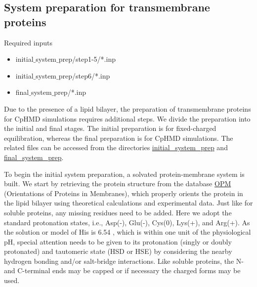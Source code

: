 \subsection{System preparation for transmembrane proteins}

\begin{checklist}{Required inputs}
\begin{itemize}
\item initial$\_$system$\_$prep/step1-5/*.inp
\item initial$\_$system$\_$prep/step6/*.inp
\item final$\_$system$\_$prep/*.inp
\end{itemize}
\end{checklist}
Due to the presence of a lipid bilayer, the preparation of transmembrane proteins for CpHMD simulations requires additional steps.
We divide the preparation into the initial and final stages.
The initial preparation is for fixed-charged equilibration,
whereas the final preparation is for CpHMD simulations.
The related files can be accessed from the directories
\href{https://gitlab.com/shenlab-amber-cphmd/cphmd-tutorial/-/tree/main/memb_hphmd_charmm/initial_system_prep/}{initial\_system\_prep}
and \href{https://gitlab.com/shenlab-amber-cphmd/cphmd-tutorial/-/tree/main/memb_hphmd_charmm/final_system_prep/}{final\_system\_prep}.

To begin the initial system preparation, a solvated protein-membrane system is built.
We start by retrieving the protein structure from the database \href{https://opm.phar.umich.edu/}{OPM} (Orientations of Proteins in Membranes), which properly orients the protein in the lipid bilayer using theoretical calculations and experimental data.\cite{Lomize_Mosberg_2006_Bioinformatics}
Just like for soluble proteins, any missing residues need to be added.
Here we adopt the standard protonation states, i.e., Asp(-), Glu(-), Cys(0), Lys(+), and Arg(+).
As the solution or model {\pka} of His is 6.54 \cite{Thurlkill_Pace_2006_ProteinSci.}, 
which is within one unit of the physiological pH, special attention needs to be given to its protonation (singly or doubly protonated) and tautomeric state (HSD or HSE) by considering 
the nearby hydrogen bonding and/or salt-bridge interactions. 
Like soluble proteins, the N- and C-terminal ends may be capped or if necessary the charged forms may be used. 

